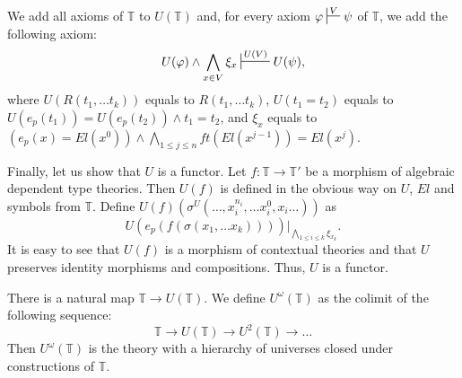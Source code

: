 \documentclass[reqno]{amsart}
\theoremstyle{definition}
\theoremstyle{remark}
\numberwithin{figure}{section}
\begin{document}
\begin{example}
We add all axioms of $\mathbb{T}$ to $U(\mathbb{T})$ and, for every axiom $\varphi \sststile{}{V} \psi$ of $\mathbb{T}$, we add the following axiom:
\[ U(\varphi) \land \bigwedge_{x \in V} \xi_x \sststile{}{U(V)} U(\psi), \]
where $U(R(t_1, \ldots t_k))$ equals to $R(t_1, \ldots t_k)$,
$U(t_1 = t_2)$ equals to $U(e_p(t_1)) = U(e_p(t_2)) \land t_1 = t_2$,
and $\xi_x$ equals to $(e_p(x) = El(x^0)) \land \bigwedge_{1 \leq j \leq n} ft(El(x^{j-1})) = El(x^j)$.

Finally, let us show that $U$ is a functor.
Let $f : \mathbb{T} \to \mathbb{T}'$ be a morphism of algebraic dependent type theories.
Then $U(f)$ is defined in the obvious way on $U$, $El$ and symbols from $\mathbb{T}$.
Define $U(f)(\sigma^U(\ldots, x^{n_i}_i, \ldots x^0_i, x_i \ldots))$ as
\[ U(e_p(f(\sigma(x_1, \ldots x_k))))|_{\bigwedge_{1 \leq i \leq k} \xi_{x_k}}. \]
It is easy to see that $U(f)$ is a morphism of contextual theories and that $U$ preserves identity morphisms and compositions.
Thus, $U$ is a functor.
\end{example}

\begin{example}
There is a natural map $\mathbb{T} \to U(\mathbb{T})$.
We define $U^\omega(\mathbb{T})$ as the colimit of the following sequence:
\[ \mathbb{T} \to U(\mathbb{T}) \to U^2(\mathbb{T}) \to \ldots \]
Then $U^\omega(\mathbb{T})$ is the theory with a hierarchy of universes closed under constructions of $\mathbb{T}$.
\end{example}



\end{document}
